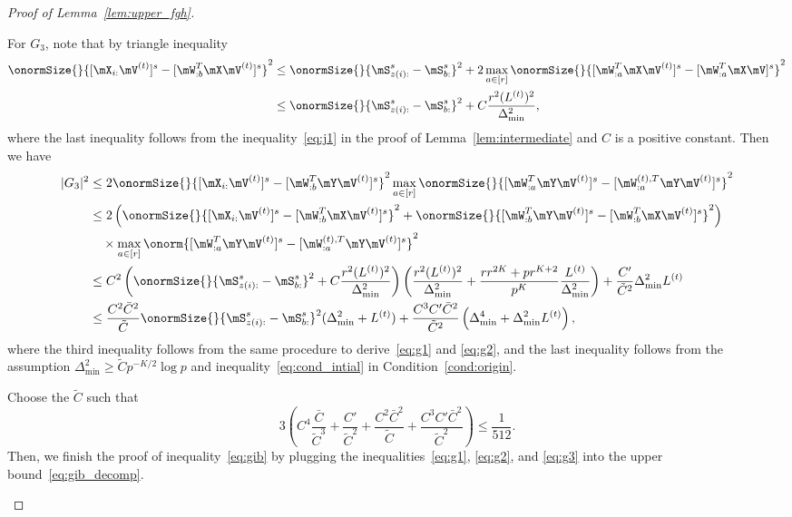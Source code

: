 \documentclass[lettersize,onecolumn,journal]{IEEEtran}
\theoremstyle{definition}
\theoremstyle{definition}
\newcommand{\of}[1]{\left(#1\right)}
\begin{document}
\begin{proof}[Proof of Lemma~\ref{lem:upper_fgh}]
\begin{enumerate}[wide]
    For $G_3$, note that by triangle inequality
    \begin{align}
        \onormSize{}{[\mX_{i:} \mV^{(t)}]^s  -  [  \mW_{:b}^T \mX \mV^{(t)} ]^s}^2 &\leq \onormSize{}{\mS_{z(i):}^s - \mS_{b:}^s}^2 + 2\max_{a \in [r]}\onormSize{}{[\mW_{:a}^T\mX \mV^{(t)}]^s - [\mW_{:a}^T\mX \mV]^s }^2\\
        & \leq \onormSize{}{\mS_{z(i):}^s - \mS_{b:}^s}^2 + C \frac{r^2 (L^{(t)})^2}{\Delta_{\min}^2}, \label{eq:g3xv_wxv}
    \end{align}
    where the last inequality follows from the inequality~\eqref{eq:j1} in the proof of Lemma~\ref{lem:intermediate} and $C$ is a positive constant.
   Then we have 
    \begin{align}
        |G_3|^2 & \leq 2 \onormSize{}{[\mX_{i:} \mV^{(t)}]^s  -  [  \mW_{:b}^T \mY \mV^{(t)} ]^s}^2 \max_{a \in [r]} \onormSize{}{ [  \mW_{:a}^T \mY \mV^{(t)} ]^s -  [   \mW_{:a}^{(t),T} \mY \mV^{(t)}  ]^s}^2 \\
        & \leq 2 \of{ \onormSize{}{[\mX_{i:} \mV^{(t)}]^s  -  [  \mW_{:b}^T \mX \mV^{(t)} ]^s}^2  +  \onormSize{}{ [  \mW_{:b}^T \mY \mV^{(t)} ]^s  -  [  \mW_{:b}^T \mX \mV^{(t)} ]^s}^2  } \\
        & \quad \times \max_{a \in [r]} \onorm{ [  \mW_{:a}^T \mY \mV^{(t)} ]^s -  [   \mW_{:a}^{(t),T} \mY \mV^{(t)}  ]^s}^2\\
        & \leq C^2 \of{\onormSize{}{\mS_{z(i):}^s - \mS_{b:}^s}^2 + C \frac{r^2 (L^{(t)})^2}{\Delta_{\min}^2} } \of{ \frac{r^2(L^{(t)})^2}{ \Delta_{\min}^2} + \frac{r r^{2K} + pr^{K+2}}{p^{K}} \frac{L^{(t)}}{\Delta_{\min}^2}}+\frac{C'}{\tilde C^2} \Delta_{\min}^2 L^{(t)} \\
        & \leq \frac{C^2 \bar C^2}{\tilde C} \onormSize{}{\mS_{z(i):}^s - \mS_{b:}^s}^2 (\Delta_{\min}^2 + L^{(t)}) +  \frac{C^3 C' \bar C^2}{\tilde C^2 }\of{\Delta_{\min}^4 +  \Delta_{\min}^2 L^{(t)}},\label{eq:g3}
    \end{align}
    where the third inequality follows from the same procedure to derive~\eqref{eq:g1} and \eqref{eq:g2}, and the last inequality follows from the assumption $\Delta_{\min}^2 \geq \tilde C p^{-K/2} \log p$ and inequality~\eqref{eq:cond_intial} in Condition~\ref{cond:origin}.
    
    Choose the $\tilde C$ such that
    \begin{equation}\label{eq:tilde_c1}
        3 \of{  C^4 \frac{\bar C}{\tilde C^3}  + \frac{C'}{\tilde C^2} + \frac{C^2 \bar C^2}{\tilde C} + \frac{C^3 C' \bar C^2}{\tilde C^2 }} \leq \frac{1}{512}.
    \end{equation}
    Then,  we finish the proof of inequality~\eqref{eq:gib} by plugging the inequalities~\eqref{eq:g1}, \eqref{eq:g2}, and \eqref{eq:g3} into the upper bound~\eqref{eq:gib_decomp}.  
    

\end{enumerate}
\end{proof}
\end{document}
